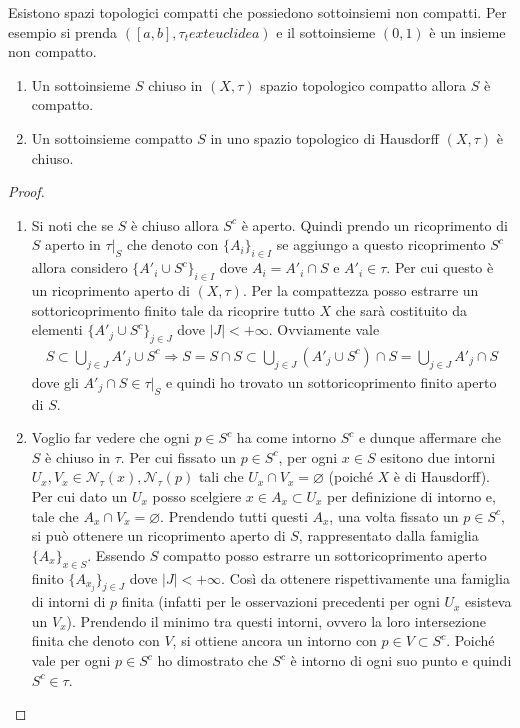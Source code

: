 \begin{remark}
	Esistono spazi topologici compatti che possiedono sottoinsiemi non compatti. Per esempio si prenda $(\left[a, b\right],\tau_text{euclidea})$ e il sottoinsieme $(0, 1)$ è un insieme non compatto. 
\end{remark} 

\begin{theorem}
	\begin{enumerate}
		\item Un sottoinsieme $S$ chiuso in $(X, \tau)$ spazio topologico compatto allora $S$ è compatto. 
		\item Un sottoinsieme compatto $S$ in uno spazio topologico di Hausdorff $(X,\tau)$ è chiuso. 
	\end{enumerate}
\end{theorem} 
\begin{proof}
	\begin{enumerate}
		\item Si noti che se $S$ è chiuso allora $S^c$ è aperto. Quindi prendo un ricoprimento di $S$ aperto in $\tau|_S$ che denoto con $\{A_i\}_{i \in I}$ se aggiungo a questo ricoprimento $S^c$ allora considero $\{A'_i \cup S^c\}_{i \in I}$ dove $A_i = A'_i \cap S$ e $A'_i \in \tau$. Per cui questo è un ricoprimento aperto di $(X,\tau)$. Per la compattezza posso estrarre un sottoricoprimento finito tale da ricoprire tutto $X$ che sarà costituito da elementi $\{A'_j \cup S^c\}_{j \in J}$ dove $|J| < +\infty$. Ovviamente vale
		\begin{equation}
		\begin{aligned}
			S \subset \bigcup_{j \in J} A'_j \cup S^c \Longrightarrow S = S \cap S \subset \bigcup_{j \in J} (A'_j \cup S^c) \cap S = \bigcup_{j \in J} A'_j  \cap S
		\end{aligned}
		\end{equation}
		dove gli $A'_j \cap S \in \tau|_S$ e quindi ho trovato un sottoricoprimento finito aperto di $S$.  
		\item 
		Voglio far vedere che ogni $p \in S^c$ ha come intorno $S^c$ e dunque affermare che $S$ è chiuso in $\tau$. Per cui fissato un $p \in S^c$, per ogni $x \in S$ esitono due intorni $U_x, V_x \in \mathcal{N}_\tau(x), \mathcal{N}_\tau(p)$ tali che $U_x \cap V_x = \varnothing$ (poiché $X$ è di Hausdorff). Per cui dato un $U_x$ posso scelgiere $x \in A_x \subset U_x$ per definizione di intorno e, tale che $A_x \cap V_x = \varnothing$. Prendendo tutti questi $A_x$, una volta fissato un $p \in S^c$, si può ottenere un ricoprimento aperto di $S$, rappresentato dalla famiglia $\{A_x\}_{x \in S}$. Essendo $S$ compatto posso estrarre un sottoricoprimento aperto finito  $\{A_{x_j}\}_{j \in J}$ dove $|J| < +\infty$. Così da ottenere rispettivamente una famiglia di intorni di $p$ finita (infatti per le osservazioni precedenti per ogni $U_x$ esisteva un $V_x$). Prendendo il minimo tra questi intorni, ovvero la loro intersezione finita che denoto con $V$, si ottiene ancora un intorno con $p \in V \subset S^c$. Poiché vale per ogni $p \in S^c$ ho dimostrato che $S^c$ è intorno di ogni suo punto e quindi $S^c \in \tau$. 
	\end{enumerate}
\end{proof}

